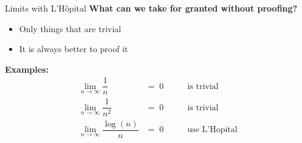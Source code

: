 
\begin{frame}{Limits with L'H\^{o}pital}
  \textbf{What can we take for granted without proofing?}
  \begin{itemize}
    \item 
      Only things that are trivial
    \item
      It is always better to proof it
  \end{itemize}
  \textbf{Examples:}
  \begin{eqnarray*}
    \lim\limits_{n \rightarrow \infty} \dfrac{1}{n} &= \; 0
      &\hspace{2em} \text{is trivial}\\
    \lim\limits_{n \rightarrow \infty} \dfrac{1}{n^2} &= \; 0
      &\hspace{2em} \text{is trivial}\\
    \lim\limits_{n \rightarrow \infty} \dfrac{\log (n)}{n} &= \; 0
      &\hspace{2em} \text{use L'Hopital}
  \end{eqnarray*}
\end{frame}